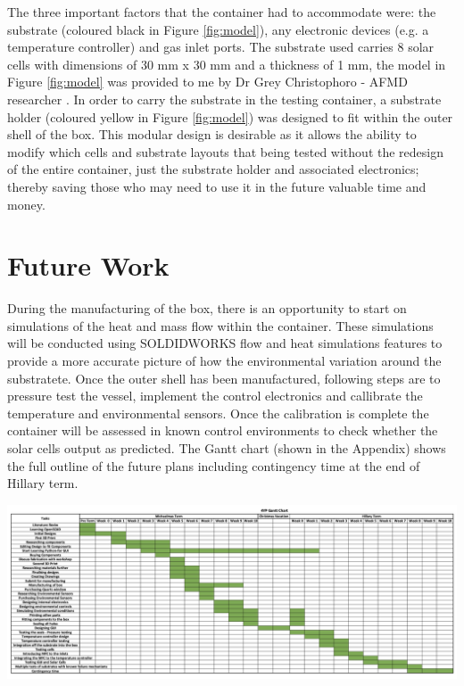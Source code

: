 \documentclass[a4paper,11pt]{article}
\begin{document}
\noindent The three important factors that the container had to accommodate were: the substrate (coloured black in Figure \ref{fig:model}), any electronic devices (e.g. a temperature controller)  and gas inlet ports. The substrate used carries 8 solar cells with dimensions of 30 mm x 30 mm and a thickness of 1 mm, the model in Figure \ref{fig:model} was provided to me by Dr Grey Christophoro - AFMD researcher \cite{RN48}. In order to carry the substrate in the testing container, a substrate holder (coloured yellow in Figure \ref{fig:model}) was designed to fit within the outer shell of the box. This modular design is desirable as it allows the ability to modify which cells and substrate layouts that being tested without the redesign of the entire container, just the substrate holder and associated electronics; thereby saving those who may need to use it in the future valuable time and money. 
\section{Future Work}
During the manufacturing of the box, there is an opportunity to start on simulations of the heat and mass flow within the container. These simulations will be conducted using SOLDIDWORKS flow and heat simulations features to provide a more accurate picture of how the environmental variation around the substratete. Once the outer shell has been manufactured, following steps are to pressure test the vessel, implement the control electronics and callibrate the temperature and environmental sensors. Once the calibration is complete the container will be assessed in known control environments to check whether the solar cells output as predicted. The Gantt chart (shown in the Appendix) shows the full outline of the future plans including contingency time at the end of Hillary term.
\begin{singlespace}

\end{singlespace}

\appendix
\appendixpage
\begin{appendix}
\includegraphics[width=1.7\linewidth, angle=270]{gantt}
\end{appendix}
\end{document}
